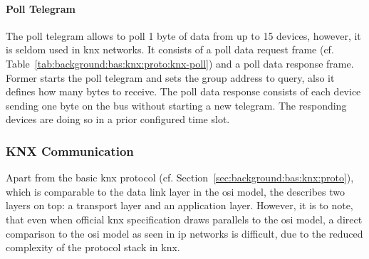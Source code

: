 

\paragraph{Poll Telegram}
\label{sec:background:bas:knx:proto:poll}

The poll telegram allows to poll 1 byte of data from up to 15 devices, however, it is seldom used in \gls{knx} networks. It consists of a poll data request frame (cf. Table~\ref{tab:background:bas:knx:proto:knx-poll}) and a poll data response frame. Former starts the poll telegram and sets the group address to query, also it defines how many bytes to receive.
The poll data response consists of each device sending one byte on the bus without starting a new telegram. The responding devices are doing so in a prior configured time slot. \parencite{Hubner2009,DIN_EN_50090-5-2}



\subsubsection{KNX Communication}
\label{sec:background:bas:knx:communication}

Apart from the basic \gls{knx} protocol (cf. Section~\ref{sec:background:bas:knx:proto}), which is comparable to the data link layer in the \gls{osi} model, the \textcite{DIN_EN_50090-4-1} describes two layers on top: a transport layer and an application layer.
However, it is to note, that even when official \gls{knx} specification draws parallels to the \gls{osi} model, a direct comparison to the \gls{osi} model as seen in \gls{ip} networks is difficult, due to the reduced complexity of the protocol stack in \gls{knx}.

